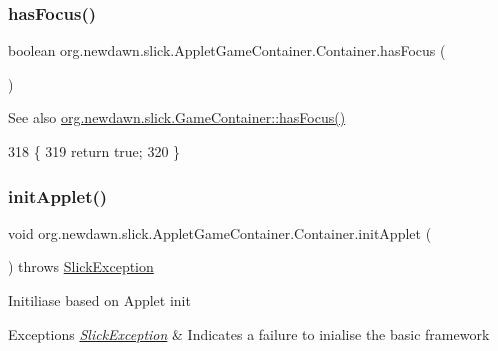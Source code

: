 \subsubsection{\texorpdfstring{has\+Focus()}{hasFocus()}}
{\footnotesize\ttfamily boolean org.\+newdawn.\+slick.\+Applet\+Game\+Container.\+Container.\+has\+Focus (\begin{DoxyParamCaption}{ }\end{DoxyParamCaption})\hspace{0.3cm}{\ttfamily [inline]}}

\begin{DoxySeeAlso}{See also}
\mbox{\hyperlink{classorg_1_1newdawn_1_1slick_1_1_game_container_a4fa0f77bdff52d66d2db55d8718b9867}{org.\+newdawn.\+slick.\+Game\+Container\+::has\+Focus()}} 
\end{DoxySeeAlso}

\begin{DoxyCode}
318                                 \{
319          \textcolor{keywordflow}{return} \textcolor{keyword}{true};
320       \}
\end{DoxyCode}
\mbox{\label{classorg_1_1newdawn_1_1slick_1_1_applet_game_container_1_1_container_ac6699a7594b3c6512ab612b3e1421246}} 
\subsubsection{\texorpdfstring{init\+Applet()}{initApplet()}}
{\footnotesize\ttfamily void org.\+newdawn.\+slick.\+Applet\+Game\+Container.\+Container.\+init\+Applet (\begin{DoxyParamCaption}{ }\end{DoxyParamCaption}) throws \mbox{\hyperlink{classorg_1_1newdawn_1_1slick_1_1_slick_exception}{Slick\+Exception}}\hspace{0.3cm}{\ttfamily [inline]}}

Initiliase based on Applet init


\begin{DoxyExceptions}{Exceptions}
{\em \mbox{\hyperlink{classorg_1_1newdawn_1_1slick_1_1_slick_exception}{Slick\+Exception}}} & Indicates a failure to inialise the basic framework \\
\hline
\end{DoxyExceptions}

